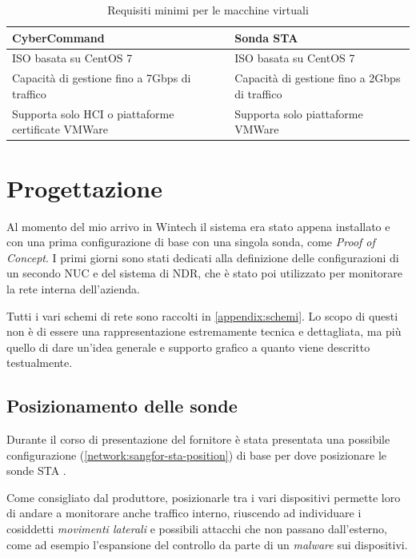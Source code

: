 \begin{table}[!htbp]
    \centering
    \begin{tabularx}{\linewidth}{XX}
        \toprule
        \textbf{CyberCommand} & \textbf{Sonda STA} \\
        \midrule
        ISO basata su CentOS 7 & ISO basata su CentOS 7 \\
        Capacità di gestione fino a 7Gbps di traffico & Capacità di gestione fino a 2Gbps di traffico \\
        Supporta solo HCI o piattaforme certificate VMWare & Supporta solo piattaforme VMWare \\
        \bottomrule
    \end{tabularx}
    \caption{Requisiti minimi per le macchine virtuali}
    \label{tab:requisiti-minimi}
\end{table}

\section{Progettazione}

Al momento del mio arrivo in Wintech il sistema era stato appena installato e con una prima configurazione di base con una singola sonda, come \emph{Proof of Concept}. I primi giorni sono stati dedicati alla definizione delle configurazioni di un secondo NUC e del sistema di NDR, che è stato poi utilizzato per monitorare la rete interna dell'azienda.

Tutti i vari schemi di rete sono raccolti in \autoref{appendix:schemi}. Lo scopo di questi non è di essere una rappresentazione estremamente tecnica e dettagliata, ma più quello di dare un'idea generale e supporto grafico a quanto viene descritto testualmente. 

\subsection{Posizionamento delle sonde}

Durante il corso di presentazione del fornitore è stata presentata una possibile configurazione (\autoref{network:sangfor-sta-position}) di base per dove posizionare le sonde STA \cite{sangfor:product-slide}.

Come consigliato dal produttore, posizionarle tra i vari dispositivi permette loro di andare a monitorare anche traffico interno, riuscendo ad individuare i cosiddetti \emph{movimenti laterali} e possibili attacchi che non passano dall'esterno, come ad esempio l'espansione del controllo da parte di un \emph{malware} sui dispositivi.

